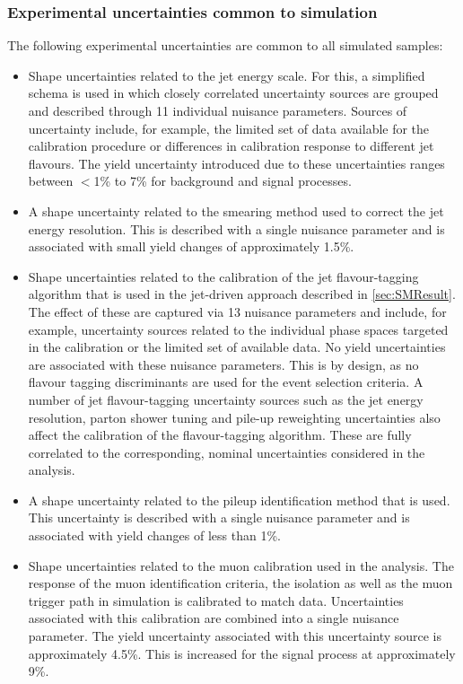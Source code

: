 \subsubsection{Experimental uncertainties common to simulation}
The following experimental uncertainties are common to all simulated samples:
\begin{itemize}
    \item Shape uncertainties related to the jet energy scale. For this, a simplified schema is used in which closely correlated uncertainty sources are grouped and described through 11 individual nuisance parameters. Sources of uncertainty include, for example, the limited set of data available for the calibration procedure or differences in calibration response to different jet flavours. The yield uncertainty introduced due to these uncertainties ranges between $<$1\% to 7\% for background and signal processes. 
    \item A shape uncertainty related to the smearing method used to correct the jet energy resolution. This is described with a single nuisance parameter and is associated with small yield changes of approximately 1.5\%. 
    \item Shape uncertainties related to the calibration of the jet flavour-tagging algorithm that is used in the jet-driven approach described in \autoref{sec:SMResult}. The effect of these are captured via 13 nuisance parameters and include, for example, uncertainty sources related to the individual phase spaces targeted in the calibration or the limited set of available data. No yield uncertainties are associated with these nuisance parameters. This is by design, as no flavour tagging discriminants are used for the event selection criteria. A number of jet flavour-tagging uncertainty sources such as the jet energy resolution, parton shower tuning and pile-up reweighting uncertainties also affect the calibration of the flavour-tagging algorithm. These are fully correlated to the corresponding, nominal uncertainties considered in the analysis.
    \item A shape uncertainty related to the pileup identification method that is used. This uncertainty is described with a single nuisance parameter and is associated with yield changes of less than 1\%. 
    \item Shape uncertainties related to the muon calibration used in the analysis. The response of the muon identification criteria, the isolation as well as the muon trigger path in simulation is calibrated to match data. Uncertainties associated with this calibration are combined into a single nuisance parameter. The yield uncertainty associated with this uncertainty source is approximately 4.5\%. This is increased for the signal process at approximately 9\%.  

\end{itemize}
